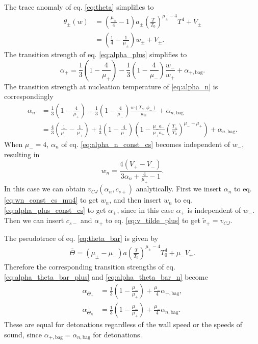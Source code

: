 The trace anomaly of eq. \eqref{eq:theta} simplifies to
\begin{align}
\theta_\pm(w)
&= \left( \frac{\mu_\pm}{4} - 1 \right) a_\pm \left( \frac{T}{T_0} \right)^{\mu_\pm - 4} T^4 + V_\pm \\
&= \left( \frac{1}{4} - \frac{1}{\mu_\pm} \right) w_\pm + V_\pm.
\label{eq:theta_const_cs}
\end{align}
The transition strength of eq. \eqref{eq:alpha_plus} simplifies to
\begin{equation}
\alpha_+ = \frac{1}{3} \left( 1 - \frac{4}{\mu_+} \right) - \frac{1}{3} \left(1 - \frac{4}{\mu_-} \right) \frac{w_-}{w_+} + \alpha_{+,\text{bag}}.
\label{eq:alpha_plus_const_cs}
\end{equation}
The transition strength at nucleation temperature of \eqref{eq:alpha_n} is correspondingly
\begin{align}
\alpha_n &= \frac{1}{3} \left( 1 - \frac{4}{\mu_+} \right) - \frac{1}{3} \left(1 - \frac{4}{\mu_-} \right) \frac{w(T_n, \phi_-)}{w_n} + \alpha_{n,\text{bag}} \\
&= \frac{4}{3} \left( \frac{1}{\mu_-} - \frac{1}{\mu_+} \right) + \frac{1}{3} \left( 1 - \frac{4}{\mu_-} \right)
\left( 1 - \frac{\mu_- a_-}{\mu_+ a_+} \left( \frac{T_n}{T_0} \right)^{\mu_- - \mu_+} \right) + \alpha_{n,\text{bag}}.
\label{eq:alpha_n_const_cs}
\end{align}
When $\mu_- = 4$, $\alpha_n$ of eq. \eqref{eq:alpha_n_const_cs} becomes independent of $w_-$, resulting in
\begin{equation}
w_n = \frac{4 (V_+ - V_-)}{3 \alpha_n + \frac{4}{\mu_+} - 1}.
\label{eq:wn_const_cs_mu4}
\end{equation}
In this case we can obtain $v_{CJ}(\alpha_n, c_{s+})$ analytically.
First we insert $\alpha_n$ to eq. \eqref{eq:wn_const_cs_mu4} to get $w_n$,
and then insert $w_n$ to eq. \eqref{eq:alpha_plus_const_cs} to get $\alpha_+$,
since in this case $\alpha_+$ is independent of $w_-$.
Then we can insert $c_{s-}$ and $\alpha_+$ to eq. \eqref{eq:v_tilde_plus} to get $\tilde{v}_+ = v_{CJ}$.

The pseudotrace of eq. \eqref{eq:theta_bar} is given by
\begin{align}
\bar{\Theta} = (\mu_\pm - \mu_-) a \left(\frac{T}{T_0}\right)^{\mu_\pm - 4} T_0^4 + \mu_- V_\pm.
\end{align}
Therefore the corresponding transition strengths of eq. \eqref{eq:alpha_theta_bar_plus} and \eqref{eq:alpha_theta_bar_n} become
\begin{align}
\alpha_{\bar{\Theta}_+} &= \frac{1}{3} \left(1 - \frac{\mu_-}{\mu_+}\right) + \frac{\mu_-}{4} \alpha_{+,\text{bag}}, \\
\alpha_{\bar{\Theta}_n} &= \frac{1}{3} \left(1 - \frac{\mu_-}{\mu_+}\right) + \frac{\mu_-}{4} \alpha_{n,\text{bag}}.
\end{align}
These are equal for detonations regardless of the wall speed or the speeds of sound,
since $\alpha_{+,\text{bag}} = \alpha_{n,\text{bag}}$ for detonations.

